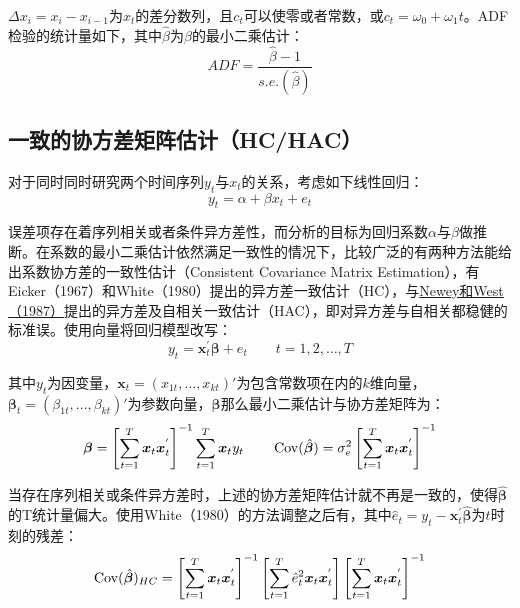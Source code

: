 \documentclass[11pt]{article}
\begin{document}
$\Delta x_{i}= x_i -x_{i-1}$为$x_t$的差分数列，且$c_t$可以使零或者常数，或$c_t=\omega_0 + \omega_1 t$。ADF检验的统计量如下，其中$\hat{\beta}$为$\beta$的最小二乘估计：
\begin{equation*}
    ADF = \frac{\hat{\beta}-1}{s.e.(\hat{\beta})}
\end{equation*}

\subsection{一致的协方差矩阵估计（HC/HAC）}

对于同时同时研究两个时间序列$y_t$与$x_t$的关系，考虑如下线性回归：
\begin{equation*}
    y_t = \alpha + \beta x_t + e_t
\end{equation*}

误差项存在着序列相关或者条件异方差性，而分析的目标为回归系数$\alpha$与$\beta$做推断。在系数的最小二乘估计依然满足一致性的情况下，比较广泛的有两种方法能给出系数协方差的一致性估计（Consistent Covariance Matrix Estimation），有Eicker（1967）和White（1980）提出的异方差一致估计（HC），与\uline{Newey和West（1987）}提出的异方差及自相关一致估计（HAC），即对异方差与自相关都稳健的标准误。使用向量将回归模型改写：
\begin{equation*}
    y_t = \bm{x}_{t}^{'} \bm{\beta} + e_t \qquad t=1,2,\dots,T
\end{equation*}

其中$y_t$为因变量，$\bm{x}_{t} = (x_{1t},\dots,x_{kt})'$为包含常数项在内的$k$维向量，$\bm{\beta}_{t} = (\beta_{1t},\dots,\beta_{kt})'$为参数向量，$\bm{\beta}$那么最小二乘估计与协方差矩阵为：
\begin{equation*}
    \bm{\beta} = \left[ \sum_{t=1}^{T} \bm{x}_t \bm{x}_{t}^{'} \right]^{-1} \sum_{t=1}^{T} \bm{x}_t y_t \qquad 
    \operatorname{Cov}(\hat{\bm{\beta}}) = \sigma_{e}^{2} \left[ \sum_{t=1}^{T} \bm{x}_t \bm{x}_{t}^{'} \right]^{-1} 
\end{equation*}

当存在序列相关或条件异方差时，上述的协方差矩阵估计就不再是一致的，使得$\bm{\hat{\beta}}$的T统计量偏大。使用White（1980）的方法调整之后有，其中$\hat{e}_t = y_t - \bm{x}_{t}^{'} \bm{\hat{\beta}}$为$t$时刻的残差：
\begin{equation*}
    \operatorname{Cov}(\hat{\bm{\beta}})_{HC} = 
    \left[ \sum_{t=1}^{T} \bm{x}_t \bm{x}_{t}^{'} \right]^{-1} 
    \left[ \sum_{t=1}^{T} \hat{e}_{t}^{2} \bm{x}_t \bm{x}_{t}^{'} \right]
    \left[ \sum_{t=1}^{T} \bm{x}_t \bm{x}_{t}^{'} \right]^{-1} 
\end{equation*}
\end{document}
